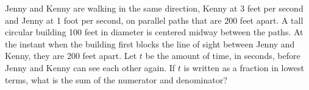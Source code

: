 Jenny and Kenny are walking in the same direction, Kenny at 3 feet per second and Jenny at 1 foot per second, on parallel paths that are 200 feet apart.  A tall circular building 100 feet in diameter is centered midway between the paths.  At the instant when the building first blocks the line of sight between Jenny and Kenny, they are 200 feet apart.  Let $t$ be the amount of time, in seconds, before Jenny and Kenny can see each other again.  If $t$ is written as a fraction in lowest terms, what is the sum of the numerator and denominator?